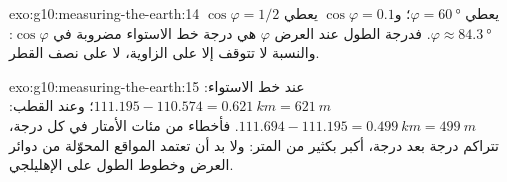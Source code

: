 \begin{solution}{exo:g10:measuring-the-earth:14}
$\cos\varphi = 1/2$ يعطي $\varphi = \qty{60}{\degree}$؛ و$\cos\varphi = 0.1$
يعطي $\varphi \approx \qty{84.3}{\degree}$. فدرجة الطول عند العرض $\varphi$
هي درجة خط الاستواء مضروبة في $\cos\varphi$: والنسبة لا تتوقف إلا على الزاوية،
لا على نصف القطر.
\end{solution}

\begin{solution}{exo:g10:measuring-the-earth:15}
عند خط الاستواء: $111.195 - 110.574 = \qty{0.621}{km} = \qty{621}{m}$؛ وعند
القطب: $111.694 - 111.195 = \qty{0.499}{km} = \qty{499}{m}$. فأخطاء من
مئات الأمتار في كل درجة، تتراكم درجة بعد درجة، أكبر بكثير من المتر: ولا بد أن
تعتمد المواقع المحوّلة من دوائر العرض وخطوط الطول على
الإهليلجي.
\end{solution}


